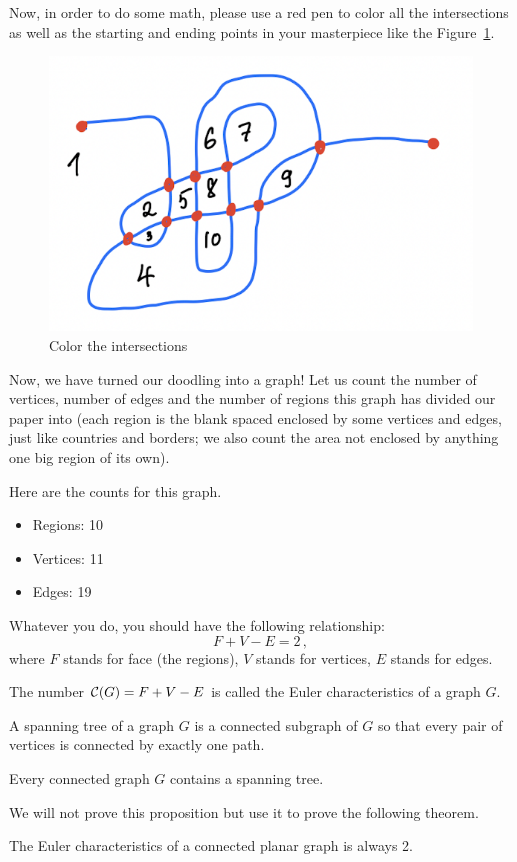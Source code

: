 Now, in order to do some math, please use a red pen to color all the intersections as well as the starting and ending points
in your masterpiece like the Figure~\ref{fig:doodle2}.

\begin{figure}[htpb]
    \centering
    \includegraphics[width=0.4\linewidth]{Figures/doodle2}
    \caption{Color the intersections}%
    \label{fig:doodle2}
\end{figure}

Now, we have turned our doodling into a graph!
Let us count the number of vertices, number of edges and the number of 
regions this graph has divided our paper into (each region is the blank spaced enclosed
by some vertices and edges, just like countries and borders; we also count the area
not enclosed by anything one big region of its own).

Here are the counts for this graph.

\begin{itemize}
    \item Regions: 10
    \item Vertices: 11
    \item Edges: 19
\end{itemize}

Whatever you do, you should have the following relationship:
\begin{equation}
    \label{eq:euler}
    F + V - E = 2 \,,
\end{equation}
where $F$ stands for face (the regions), $V$ stands for vertices, $E$ stands for edges.

\begin{definition}
    The number $\mathcal{C}(G) = F + V - E$ is called the Euler characteristics of a graph $G$.
\end{definition}

\begin{definition}
   A spanning tree of a graph $G$ is a connected subgraph of $G$ 
   so that every pair of vertices is connected by exactly one path. 
\end{definition}

\begin{proposition}
    \label{t:spanning-tree}
   Every connected graph $G$ contains a spanning tree. 
\end{proposition}
We will not prove this proposition but use it to prove the following theorem.
\begin{theorem}
   The Euler characteristics of a connected planar graph is always 2. 
\end{theorem}

